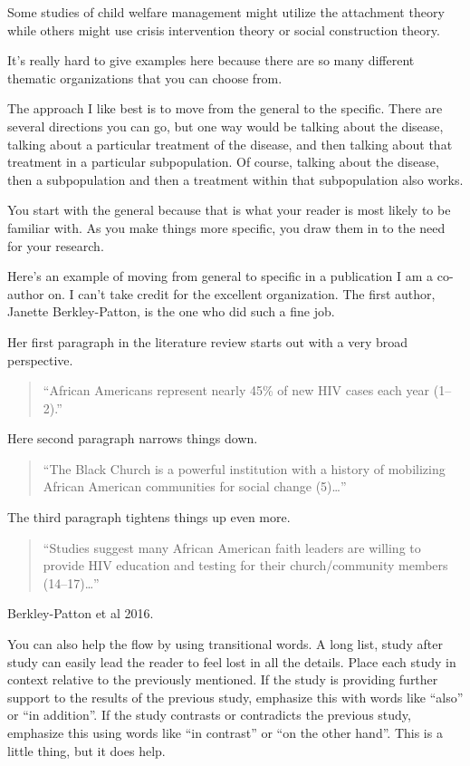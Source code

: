 \documentclass[
  letterpaper,
  DIV=11,
  numbers=noendperiod]{scrreprt}
\begin{document}
\begin{tcolorbox}
Some studies of child welfare management might utilize the attachment
theory while others might use crisis intervention theory or social
construction theory.

It's really hard to give examples here because there are so many
different thematic organizations that you can choose from.

The approach I like best is to move from the general to the specific.
There are several directions you can go, but one way would be talking
about the disease, talking about a particular treatment of the disease,
and then talking about that treatment in a particular subpopulation. Of
course, talking about the disease, then a subpopulation and then a
treatment within that subpopulation also works.

You start with the general because that is what your reader is most
likely to be familiar with. As you make things more specific, you draw
them in to the need for your research.

Here's an example of moving from general to specific in a publication I
am a co-author on. I can't take credit for the excellent organization.
The first author, Janette Berkley-Patton, is the one who did such a fine
job.

Her first paragraph in the literature review starts out with a very
broad perspective.

\begin{quote}
``African Americans represent nearly 45\% of new HIV cases each year
(1--2).''
\end{quote}

Here second paragraph narrows things down.

\begin{quote}
``The Black Church is a powerful institution with a history of
mobilizing African American communities for social change (5)\ldots{}''
\end{quote}

The third paragraph tightens things up even more.

\begin{quote}
``Studies suggest many African American faith leaders are willing to
provide HIV education and testing for their church/community members
(14--17)\ldots{}''
\end{quote}

Berkley-Patton et al 2016.

You can also help the flow by using transitional words. A long list,
study after study can easily lead the reader to feel lost in all the
details. Place each study in context relative to the previously
mentioned. If the study is providing further support to the results of
the previous study, emphasize this with words like ``also'' or ``in
addition''. If the study contrasts or contradicts the previous study,
emphasize this using words like ``in contrast'' or ``on the other
hand''. This is a little thing, but it does help.


\end{tcolorbox}
\end{document}
